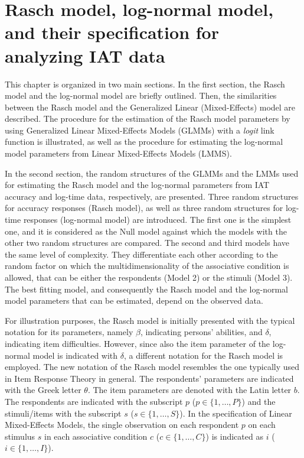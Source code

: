 \documentclass[12pt]{book}
\begin{document}
\chapter[Rasch model, Log-normal model, and LMMs]{Rasch model, log-normal model, and their specification for analyzing IAT data}\label{chap:modelsIAT}
This chapter is organized in two main sections. 
In the first section, the Rasch model and the log-normal model are briefly outlined. 
Then, the similarities between the Rasch model and the Generalized Linear (Mixed-Effects) model are described. 
The procedure for the estimation of the Rasch model parameters by using Generalized Linear Mixed-Effects Models (GLMMs) with a \emph{logit} link function is illustrated, as well as the procedure for estimating the log-normal model parameters from Linear Mixed-Effects Models (LMMS). 

In the second section, the random structures of the GLMMs and the LMMs used for estimating the Rasch model and the log-normal parameters from IAT accuracy and log-time data, respectively, are presented. 
Three random structures for accuracy responses (Rasch model), as well as three random structures for log-time responses (log-normal model) are introduced. The first one is the simplest one, and it is considered as the Null model against which the models with the other two random structures are compared. 
The second and third models have the same level of complexity. They differentiate each other according to the random factor on which the multidimensionality of the associative condition is allowed, that can be either the respondents (Model 2) or the stimuli (Model 3). 
The best fitting model, and consequently the Rasch model and the log-normal model parameters that can be estimated, depend on the observed data.

For illustration purposes, the Rasch model is initially presented with the typical notation for its parameters, namely $\beta$, indicating persons' abilities, and $\delta$, indicating item difficulties. 
However, since also the item parameter of the log-normal model is indicated with $\delta$, a different notation for the Rasch model is employed. The new notation of the Rasch model resembles the one typically used in Item Response Theory in general. 
The respondents' parameters are indicated with the Greek letter $\theta$. The item parameters are denoted with the Latin letter $b$. 
The respondents are indicated with the subscript $p$ ($p \in \{1, \ldots, P\}$) and the stimuli/items with the subscript $s$ ($s \in \{1, \ldots, S\}$).
In the specification of Linear Mixed-Effects Models, the single observation on each respondent $p$ on each stimulus $s$ in each associative condition $c$ ($c \in \{1, \ldots, C\}$) is indicated as $i$ ($i \in \{1,\ldots, I\}$).
\end{document}
